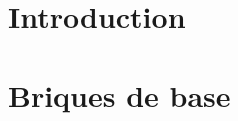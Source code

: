 \documentclass[a4paper, 12pt]{memoir}
\begin{document}
\thispagestyle{plain}


\newpage

\tableofcontents

\chapter*{Introduction}


\chapter{Briques de base}

\end{document}
